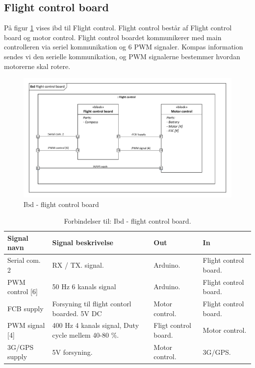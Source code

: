 \subsection{Flight control board}

På figur \ref{fig:ibd_flightcontrolboard} vises ibd til Flight control. Flight control består af Flight control board og motor control. Flight control boardet kommunikerer med main controlleren via seriel kommunikation og 6 PWM signaler. Kompas information sendes vi den serielle kommunikation, og PWM signalerne bestemmer hvordan motorerne skal rotere. 

\begin{figure}[H]
\centering
\includegraphics[width=1\textwidth]{Billeder/IBD/ibd5_flightcontrolboard.pdf}
\vspace{-1cm}
\caption{Ibd - flight control board}
\label{fig:ibd_flightcontrolboard}
\end{figure}

\begin{table}[H]
	\centering
		\begin{tabular}{|p{2.6 cm}|p{4.9 cm}|p{2.5 cm}|p{2.5 cm}|} 
		\hline
			\textbf{Signal navn} 	& \textbf{Signal beskrivelse}		& \textbf{Out} 				& \textbf{In}     \\ \hline
			Serial com. 2 & RX / TX. signal. & Arduino. & Flight control board.			    \\ \hline
			PWM control [6] & 50 Hz 6 kanals signal & Arduino. & Flight control board.				\\ \hline
			FCB supply &  Forsyning til flight contorl boarded. 5V DC & Motor control. & Flight control board.	\\ \hline
			PWM signal [4] & 400 Hz 4 kanals signal, Duty cycle mellem 40-80 $\%$. & Fligt control board. & Motor control.   \\ \hline 
			3G/GPS supply & 5V forsyning. & Motor control. & 3G/GPS.  \\ \hline 
		\end{tabular}
	\caption{Forbindelser til: Ibd - flight control board. }
	\label{tab:ibd_Flight_control_board}
\end{table}




